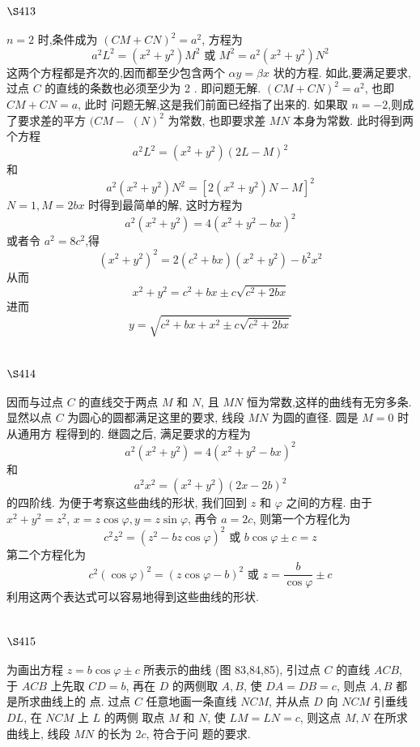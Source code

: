 \section{$\S 413$}

$n=2$ 时,条件成为 $(C M+C N)^{2}=a^{2}$, 方程为
\[
a^{2} L^{2}=\left(x^{2}+y^{2}\right) M^{2} \text { 或 } M^{2}=a^{2}\left(x^{2}+y^{2}\right) N^{2}
\]
这两个方程都是齐次的,因而都至少包含两个 $\alpha y=\beta x$ 状的方程. 如此,要满足要求,过点 $C$ 的直线的条数也必须至少为 2 . 即问题无解. $(C M+C N)^{2}=a^{2}$, 也即 $C M+C N=a$, 此时 问题无解,这是我们前面已经指了出来的. 如果取 $n=-2$,则成了要求差的平方 $(C M-$ $(N)^{2}$ 为常数, 也即要求差 $M N$ 本身为常数. 此时得到两个方程
\[
a^{2} L^{2}=\left(x^{2}+y^{2}\right)(2 L-M)^{2}
\]
和
\[
a^{2}\left(x^{2}+y^{2}\right) N^{2}=\left[2\left(x^{2}+y^{2}\right) N-M\right]^{2}
\]
$N=1, M=2 b x$ 时得到最简单的解, 这时方程为
\[
a^{2}\left(x^{2}+y^{2}\right)=4\left(x^{2}+y^{2}-b x\right)^{2}
\]
或者令 $a^{2}=8 c^{2}$,得
\[
\left(x^{2}+y^{2}\right)^{2}=2\left(c^{2}+b x\right)\left(x^{2}+y^{2}\right)-b^{2} x^{2}
\]
从而
\[
x^{2}+y^{2}=c^{2}+b x \pm c \sqrt{c^{2}+2 b x}
\]
进而
\[
y=\sqrt{c^{2}+b x+x^{2} \pm c \sqrt{c^{2}+2 b x}}
\]
\section{$\S 414$}

因而与过点 $C$ 的直线交于两点 $M$ 和 $N$, 且 $M N$ 恒为常数,这样的曲线有无穷多条. 显然以点 $C$ 为圆心的圆都满足这里的要求, 线段 $M N$ 为圆的直径. 圆是 $M=0$ 时从通用方 程得到的. 继圆之后, 满足要求的方程为
\[
a^{2}\left(x^{2}+y^{2}\right)=4\left(x^{2}+y^{2}-b x\right)^{2}
\]
和
\[
a^{2} x^{2}=\left(x^{2}+y^{2}\right)(2 x-2 b)^{2}
\]
的四阶线. 为便于考察这些曲线的形状, 我们回到 $z$ 和 $\varphi$ 之间的方程. 由于 $x^{2}+y^{2}=z^{2}$, $x=z \cos \varphi, y=z \sin \varphi$, 再令 $a=2 c$, 则第一个方程化为
\[
c^{2} z^{2}=\left(z^{2}-b z \cos \varphi\right)^{2} \text { 或 } b \cos \varphi \pm c=z
\]
第二个方程化为
\[
c^{2}(\cos \varphi)^{2}=(z \cos \varphi-b)^{2} \text { 或 } z=\frac{b}{\cos \varphi} \pm c
\]
利用这两个表达式可以容易地得到这些曲线的形状.

\section{$\S 415$}

为画出方程 $z=b \cos \varphi \pm c$ 所表示的曲线 (图 83,84,85), 引过点 $C$ 的直线 $A C B$, 于 $A C B$ 上先取 $C D=b$, 再在 $D$ 的两侧取 $A, B$, 使 $D A=D B=c$, 则点 $A, B$ 都是所求曲线上的 点. 过点 $C$ 任意地画一条直线 $N C M$, 并从点 $D$ 向 $N C M$ 引垂线 $D L$, 在 $N C M$ 上 $L$ 的两侧 取点 $M$ 和 $N$, 使 $L M=L N=c$, 则这点 $M, N$ 在所求曲线上, 线段 $M N$ 的长为 $2 c$, 符合于问 题的要求.


